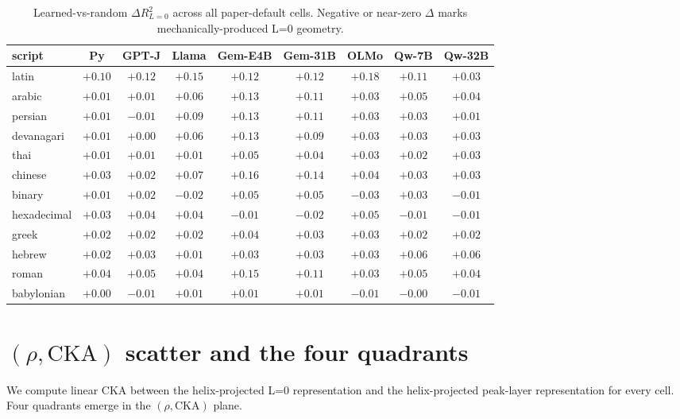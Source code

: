 \documentclass[10pt,letterpaper]{article}
\begin{document}
\begin{table}[h]
\caption{Learned-vs-random $\Delta R^2_{L=0}$ across all paper-default
  cells. Negative or near-zero $\Delta$ marks mechanically-produced
  L=0 geometry.}
\label{tab:embed-full}
\centering
\small
\setlength{\tabcolsep}{3pt}
\begin{tabular}{lcccccccc}
\toprule
script & Py & GPT-J & Llama & Gem-E4B & Gem-31B & OLMo & Qw-7B & Qw-32B \\
\midrule
latin       & $+0.10$ & $+0.12$ & $+0.15$ & $+0.12$ & $+0.12$ & $+0.18$ & $+0.11$ & $+0.03$ \\
arabic      & $+0.01$ & $+0.01$ & $+0.06$ & $+0.13$ & $+0.11$ & $+0.03$ & $+0.05$ & $+0.04$ \\
persian     & $+0.01$ & $-0.01$ & $+0.09$ & $+0.13$ & $+0.11$ & $+0.03$ & $+0.03$ & $+0.01$ \\
devanagari  & $+0.01$ & $+0.00$ & $+0.06$ & $+0.13$ & $+0.09$ & $+0.03$ & $+0.03$ & $+0.03$ \\
thai        & $+0.01$ & $+0.01$ & $+0.01$ & $+0.05$ & $+0.04$ & $+0.03$ & $+0.02$ & $+0.03$ \\
chinese     & $+0.03$ & $+0.02$ & $+0.07$ & $+0.16$ & $+0.14$ & $+0.04$ & $+0.03$ & $+0.03$ \\
binary      & $+0.01$ & $+0.02$ & $-0.02$ & $+0.05$ & $+0.05$ & $-0.03$ & $+0.03$ & $-0.01$ \\
hexadecimal & $+0.03$ & $+0.04$ & $+0.04$ & $-0.01$ & $-0.02$ & $+0.05$ & $-0.01$ & $-0.01$ \\
greek       & $+0.02$ & $+0.02$ & $+0.02$ & $+0.04$ & $+0.03$ & $+0.03$ & $+0.02$ & $+0.02$ \\
hebrew      & $+0.02$ & $+0.03$ & $+0.01$ & $+0.03$ & $+0.03$ & $+0.03$ & $+0.06$ & $+0.06$ \\
roman       & $+0.04$ & $+0.05$ & $+0.04$ & $+0.15$ & $+0.11$ & $+0.03$ & $+0.05$ & $+0.04$ \\
babylonian  & $+0.00$ & $-0.01$ & $+0.01$ & $+0.01$ & $+0.01$ & $-0.01$ & $-0.00$ & $-0.01$ \\
\bottomrule
\end{tabular}
\end{table}

\section{$(\rho, \text{CKA})$ scatter and the four quadrants}
\label{app:cka}

We compute linear CKA between the helix-projected L=0 representation
and the helix-projected peak-layer representation for every cell. Four
quadrants emerge in the $(\rho, \text{CKA})$ plane.
\end{document}
